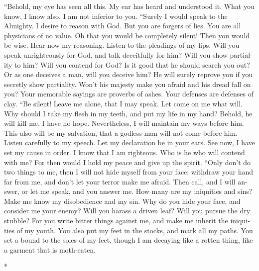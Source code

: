 \begin{paracol}{2}
\begin{otherlanguage}{english}
 ``Behold, my eye has seen all this. My ear has heard and
understood it.  What you know, I know also. I am not
inferior to you.  ``Surely I would speak to the Almighty.
I desire to reason with God.  But you are forgers of lies.
You are all physicians of no value.  Oh that you would be
completely silent! Then you would be wise.  Hear now my
reasoning. Listen to the pleadings of my lips.  Will you
speak unrighteously for God, and talk deceitfully for him?
 Will you show partiality to him? Will you contend for
God?  Is it good that he should search you out? Or as one
deceives a man, will you deceive him?  He will surely
reprove you if you secretly show partiality.  Won't his
majesty make you afraid and his dread fall on you?  Your
memorable sayings are proverbs of ashes. Your defenses are defenses of
clay.  ``Be silent! Leave me alone, that I may speak. Let
come on me what will.  Why should I take my flesh in my
teeth, and put my life in my hand?  Behold, he will kill
me. I have no hope. Nevertheless, I will maintain my ways before him.
 This also will be my salvation, that a godless man will
not come before him.  Listen carefully to my speech. Let
my declaration be in your ears.  See now, I have set my
cause in order. I know that I am righteous.  Who is he
who will contend with me? For then would I hold my peace and give up the
spirit.  ``Only don't do two things to me, then I will
not hide myself from your face:  withdraw your hand far
from me, and don't let your terror make me afraid.  Then
call, and I will answer, or let me speak, and you answer me.
 How many are my iniquities and sins? Make me know my
disobedience and my sin.  Why do you hide your face, and
consider me your enemy?  Will you harass a driven leaf?
Will you pursue the dry stubble?  For you write bitter
things against me, and make me inherit the iniquities of my youth.
 You also put my feet in the stocks, and mark all my
paths. You set a bound to the soles of my feet,  though I
am decaying like a rotten thing, like a garment that is moth-eaten.

\end{otherlanguage}

\switchcolumn[0]*


\end{paracol}
